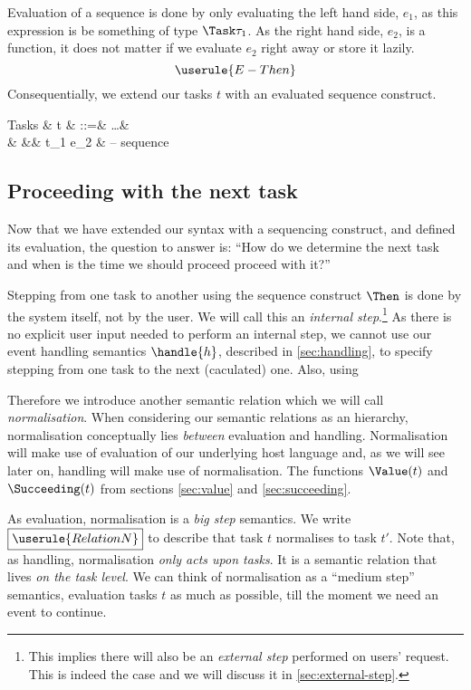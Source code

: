 Evaluation of a sequence is done by only evaluating the left hand side, $e_1$,
as this expression is be something of type $\Task \tau_1$.
As the right hand side, $e_2$, is a function,
it does not matter if we evaluate $e_2$ right away or store it lazily.
\begin{equation*}
  \userule{E-Then}
\end{equation*}
Consequentially, we extend our tasks $t$ with an evaluated sequence construct.
\begin{grammar}
  Tasks
    & t & ::=& \ldots        & \\
    &   &\mid& t_1 \Then e_2 & – sequence \\
\end{grammar}


\subsection{Proceeding with the next task}
\label{sec:normalisation}

Now that we have extended our syntax with a sequencing construct,
and defined its evaluation,
the question to answer is:
\enquote{How do we determine the next task
and when is the time we should proceed proceed with it?}

Stepping from one task to another using the sequence construct $\Then$ is done by the system itself,
not by the user.
We will call this an \emph{internal step}.\footnote{
  This implies there will also be an \emph{external step}
  performed on users' request.
  This is indeed the case and we will discuss it in \autoref{sec:external-step}.
}
As there is no explicit user input needed to perform an internal step,
we cannot use our event handling semantics $\handle{h}$,
described in \autoref{sec:handling},
to specify stepping from one task to the next (caculated) one.
Also,
using

Therefore we introduce another semantic relation which we will call \emph{normalisation}.
When considering our semantic relations as an hierarchy,
normalisation conceptually lies \emph{between} evaluation and handling.
Normalisation will make use of evaluation of our underlying host language and,
as we will see later on,
handling will make use of normalisation.
The functions $\Value(t)$ and $\Succeeding(t)$ from sections \autoref{sec:value} and \autoref{sec:succeeding}.

As evaluation,
normalisation is a \emph{big step} semantics.
We write $\boxed{\userule{RelationN}}$ to describe that
task $t$ normalises to task $t'$.
Note that, as handling,
normalisation \emph{only acts upon tasks}.
It is a semantic relation that lives \emph{on the task level}.
We can think of normalisation as a \enquote{medium step} semantics,
evaluation tasks $t$ as much as possible,
till the moment we need an event to continue.

